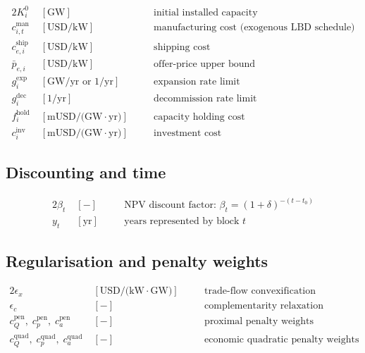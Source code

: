 \documentclass[11pt]{article}
\newcommand{\tmin}{t_{0}}
\begin{document}
\begin{alignat*}{2}
  K^{0}_i           &\;[\text{GW}]
    &&\quad\text{initial installed capacity}           \\
  c^{\mathrm{man}}_{i,t} &\;[\text{USD/kW}]
    &&\quad\text{manufacturing cost (exogenous LBD schedule)} \\
  c^{\mathrm{ship}}_{e,i} &\;[\text{USD/kW}]
    &&\quad\text{shipping cost}                        \\
  \bar{p}_{e,i}     &\;[\text{USD/kW}]
    &&\quad\text{offer-price upper bound}              \\
  g^{\mathrm{exp}}_i &\;[\text{GW/yr or 1/yr}]
    &&\quad\text{expansion rate limit}                 \\
  g^{\mathrm{dec}}_i &\;[\text{1/yr}]
    &&\quad\text{decommission rate limit}              \\
  f^{\mathrm{hold}}_i &\;[\text{mUSD/(GW$\cdot$yr)}]
    &&\quad\text{capacity holding cost}                \\
  c^{\mathrm{inv}}_i  &\;[\text{mUSD/(GW$\cdot$yr)}]
    &&\quad\text{investment cost}
\end{alignat*}

\subsection*{Discounting and time}

\begin{alignat*}{2}
  \beta_t &\;[-]
    &&\quad\text{NPV discount factor: }
      \beta_t = (1+\delta)^{-(t-\tmin)}        \\
  y_t     &\;[\text{yr}]
    &&\quad\text{years represented by block } t
\end{alignat*}

\subsection*{Regularisation and penalty weights}

\begin{alignat*}{2}
  \epsilon_x     &\;[\text{USD/(kW$\cdot$GW)}]
    &&\quad\text{trade-flow convexification}     \\
  \epsilon_c     &\;[-]
    &&\quad\text{complementarity relaxation}     \\[4pt]
  c^{\mathrm{pen}}_Q,\;c^{\mathrm{pen}}_p,\;c^{\mathrm{pen}}_a
                  &\;[-]
    &&\quad\text{proximal penalty weights (algorithmic)} \\
  c^{\mathrm{quad}}_Q,\;c^{\mathrm{quad}}_p,\;c^{\mathrm{quad}}_a
                  &\;[-]
    &&\quad\text{economic quadratic penalty weights}
\end{alignat*}
\end{document}
